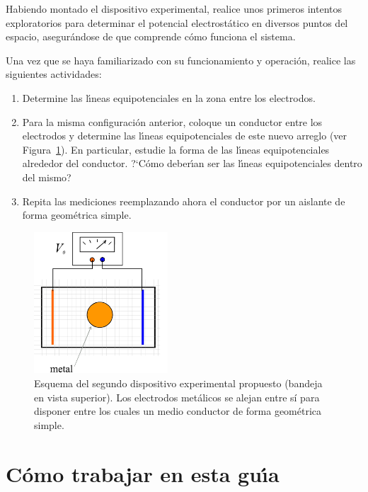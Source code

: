 \documentclass[laboratorio]{guia}
\begin{document}
Habiendo montado el dispositivo experimental, realice unos primeros intentos
exploratorios para determinar el potencial electrost\'atico en diversos puntos
del espacio, asegur\'andose de que comprende c\'omo funciona el sistema. 

Una vez que se haya familiarizado con su funcionamiento y operaci\'on, realice
las siguientes actividades:
\begin{enumerate}
    \item Determine las l\'\i neas equipotenciales en la zona entre los electrodos.
    \item Para la misma configuraci\'on anterior, coloque un conductor entre los 
        electrodos y determine las l\'\i neas equipotenciales de este nuevo 
        arreglo (ver Figura~\ref{fig:2}). En particular, estudie la forma de las  l\'\i neas 
        equipotenciales alrededor del conductor. ?`C\'omo deber\'\i an ser las 
        l\'\i neas equipotenciales dentro del mismo?  
    \item Repita las mediciones reemplazando ahora el conductor por un aislante de forma
        geom\'etrica simple.
\end{enumerate}


\begin{figure}[t!]
    \centering
\includegraphics[width=5cm]{LG01--001.png}
\caption{Esquema del segundo dispositivo experimental propuesto (bandeja en vista
superior). 
Los electrodos met\'alicos se alejan entre sí para disponer entre los cuales un medio conductor de forma geom\'etrica simple. 
}
    \label{fig:2}
\end{figure}

\section{C\'omo trabajar en esta gu\'\i a}
\end{document}
